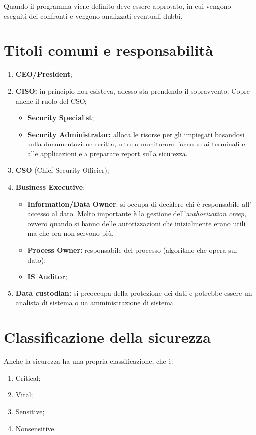 Quando il programma viene definito deve essere approvato, in cui vengono
eseguiti dei confronti e vengono analizzati eventuali dubbi.

\section{Titoli comuni e responsabilità}

\begin{enumerate}
  \item \textbf{CEO/President};
  \item \textbf{CISO:} in principio non esisteva, adesso sta prendendo il sopravvento.
Copre anche il ruolo del CSO;
  \begin{itemize}
        \item \textbf{Security Specialist};
        \item \textbf{Security Administrator:} alloca le risorse per gli impiegati 
        basandosi sulla documentazione scritta, oltre a monitorare l'accesso 
        ai terminali e alle applicazioni e a preparare report sulla sicurezza.
  \end{itemize}
  \item \textbf{CSO} (Chief Security Officier);
  \item \textbf{Business Executive};
  \begin{itemize}
  \item \textbf{Information/Data Owner}: si occupa di decidere chi è responsabile all'
  accesso al dato. Molto importante è la gestione dell'\textit{authorization 
  creep}, ovvero quando si hanno delle autorizzazioni che inizialmente erano 
  utili ma che ora non servono più.
  \item \textbf{Process Owner:} responsabile del processo (algoritmo che opera sul dato);
  \item \textbf{IS Auditor};
  \end{itemize}
  \item \textbf{Data custodian:} si preoccupa della protezione dei dati e potrebbe essere un analista di
  sistema o un amministrazione di sistema.
\end{enumerate}

\section{Classificazione della sicurezza}

Anche la sicurezza ha una propria classificazione, che è:
\begin{enumerate}
  \item Critical;
  \item Vital;
  \item Sensitive;
  \item Nonsensitive.
\end{enumerate}

